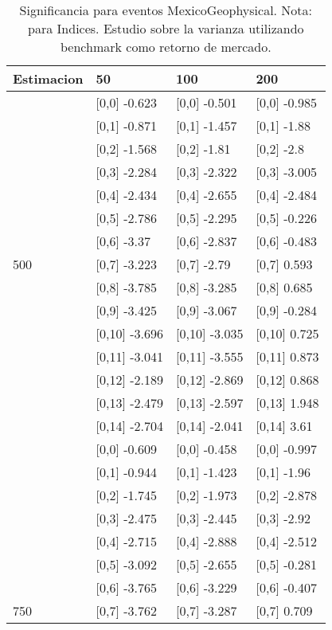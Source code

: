 \begin{table}

\caption{Significancia para eventos MexicoGeophysical. Nota: para Indices. Estudio sobre la varianza utilizando benchmark como retorno de mercado.}
\centering
\begin{tabular}[t]{llll}
\toprule
Estimacion & 50 & 100 & 200\\
\midrule
 & {}[0,0] -0.623 & {}[0,0] -0.501 & {}[0,0] -0.985\\
 & {}[0,1] -0.871 & {}[0,1] -1.457 & {}[0,1] -1.88\\
 & {}[0,2] -1.568 & {}[0,2] -1.81 & {}[0,2] -2.8\\
 & {}[0,3] -2.284 & {}[0,3] -2.322 & {}[0,3] -3.005\\
 & {}[0,4] -2.434 & {}[0,4] -2.655 & {}[0,4] -2.484\\
\addlinespace
 & {}[0,5] -2.786 & {}[0,5] -2.295 & {}[0,5] -0.226\\
 & {}[0,6] -3.37 & {}[0,6] -2.837 & {}[0,6] -0.483\\
500 & {}[0,7] -3.223 & {}[0,7] -2.79 & {}[0,7] 0.593\\
 & {}[0,8] -3.785 & {}[0,8] -3.285 & {}[0,8] 0.685\\
 & {}[0,9] -3.425 & {}[0,9] -3.067 & {}[0,9] -0.284\\
\addlinespace
 & {}[0,10] -3.696 & {}[0,10] -3.035 & {}[0,10] 0.725\\
 & {}[0,11] -3.041 & {}[0,11] -3.555 & {}[0,11] 0.873\\
 & {}[0,12] -2.189 & {}[0,12] -2.869 & {}[0,12] 0.868\\
 & {}[0,13] -2.479 & {}[0,13] -2.597 & {}[0,13] 1.948\\
 & {}[0,14] -2.704 & {}[0,14] -2.041 & {}[0,14] 3.61\\
\addlinespace
 & {}[0,0] -0.609 & {}[0,0] -0.458 & {}[0,0] -0.997\\
 & {}[0,1] -0.944 & {}[0,1] -1.423 & {}[0,1] -1.96\\
 & {}[0,2] -1.745 & {}[0,2] -1.973 & {}[0,2] -2.878\\
 & {}[0,3] -2.475 & {}[0,3] -2.445 & {}[0,3] -2.92\\
 & {}[0,4] -2.715 & {}[0,4] -2.888 & {}[0,4] -2.512\\
\addlinespace
 & {}[0,5] -3.092 & {}[0,5] -2.655 & {}[0,5] -0.281\\
 & {}[0,6] -3.765 & {}[0,6] -3.229 & {}[0,6] -0.407\\
750 & {}[0,7] -3.762 & {}[0,7] -3.287 & {}[0,7] 0.709\\

\end{tabular}
\end{table}
